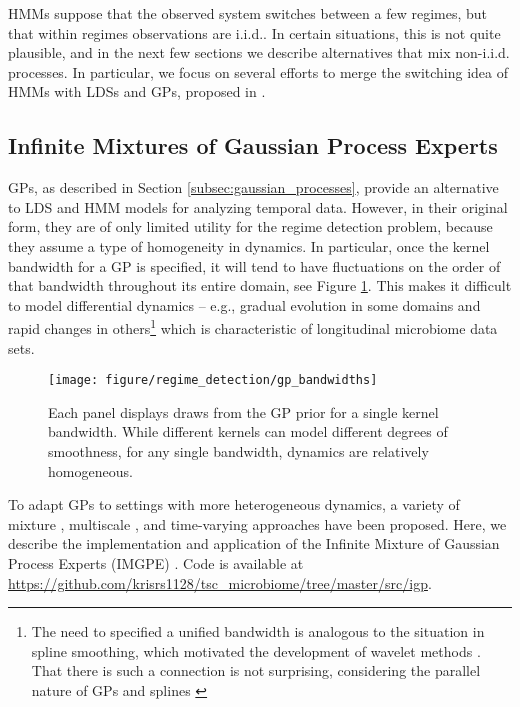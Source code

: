 HMMs suppose that the observed system switches between a few regimes, but that
within regimes observations are i.i.d.. In certain situations, this is not quite
plausible, and in the next few sections we describe alternatives that mix
non-i.i.d. processes. In particular, we focus on several efforts to merge the
switching idea of HMMs with LDSs and GPs, proposed in
\citep{ghahramani1998variational, rasmussen2002infinite, fox2012multiresolution,
  linderman2016recurrent}.

\subsection{Infinite Mixtures of Gaussian Process Experts}
\label{subsec:imgpe}

GPs, as described in Section \ref{subsec:gaussian_processes}, provide an
alternative to LDS and HMM models for analyzing temporal data. However, in their
original form, they are of only limited utility for the regime detection
problem, because they assume a type of homogeneity in dynamics. In particular,
once the kernel bandwidth for a GP is specified, it will tend to have
fluctuations on the order of that bandwidth throughout its entire domain, see
Figure \ref{fig:gp_bandwidths}. This makes it difficult to model differential
dynamics -- e.g., gradual evolution in some domains and rapid changes in
others\footnote{The need to specified a unified bandwidth is analogous to the
  situation in spline smoothing, which motivated the development of wavelet
  methods \citep{donoho1995adapting}. That there is such a connection is not
  surprising, considering the parallel nature of GPs and splines
  \citep{kimeldorf1970correspondence}} which is characteristic of longitudinal
microbiome data sets.

\begin{figure}
  \centering
  \texttt{[image: figure/regime\_detection/gp\_bandwidths]}
  \caption{Each panel displays draws from the GP prior for a single kernel
    bandwidth. While different kernels can model different degrees of
    smoothness, for any single bandwidth, dynamics are relatively
    homogeneous. \label{fig:gp_bandwidths} }
\end{figure}

To adapt GPs to settings with more heterogeneous dynamics, a variety of mixture
\citep{tresp2001mixtures, rasmussen2002infinite}, multiscale
\citep{fox2012multiresolution, samostring}, and time-varying
\citep{paciorek2003nonstationary, heinonen2016non} approaches have been
proposed. Here, we describe the implementation and application of the Infinite
Mixture of Gaussian Process Experts (IMGPE) \citep{rasmussen2002infinite}. Code
is available at
\url{https://github.com/krisrs1128/tsc_microbiome/tree/master/src/igp}.

